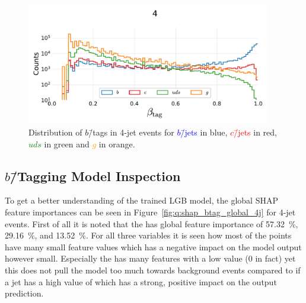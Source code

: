 \begin{figure}[h!]
  \centerfloat
  \includegraphics[width=0.95\textwidth, trim=15 15 15 50, clip]{figures/quarks/btag_scores_histogram_-njet=4-down_sample=1.00-ML_vars=vertex-selection=b-ejet_min=4-n_iter_RS_lgb=99-n_iter_RS_xgb=9-cdot_cut=0.90-version=19.pdf}
  \caption[Distribution of $b$\=/Tags in 4-Jet Events]
          {Distribution of $b$\=/tags in 4-jet events for \textcolor{blue}{$b$\=/jets} in blue, \textcolor{red}{$c$\=/jets} in red, \textcolor{green}{$uds$} in green and \textcolor{orange}{$g$} in orange.} 
  \label{fig:q:btag_histogram_4j}
\end{figure}


\subsection{$b$\=/Tagging Model Inspection}

To get a better understanding of the trained LGB model, the global SHAP feature importances can be seen in Figure~\ref{fig:q:shap_btag_global_4j} for 4-jet events. First of all it is noted that the  has global feature importance of \SI{57.32}{\percent},  \SI{29.16}{\percent}, and  \SI{13.52}{\percent}. For all three variables it is seen how most of the points have many small feature values which has a negative impact on the model output however small. Especially the  has many features with a low value (\num{0} in fact) yet this does not pull the model too much towards background events compared to if a jet has a high value of  which has a strong, positive impact on the output prediction.

